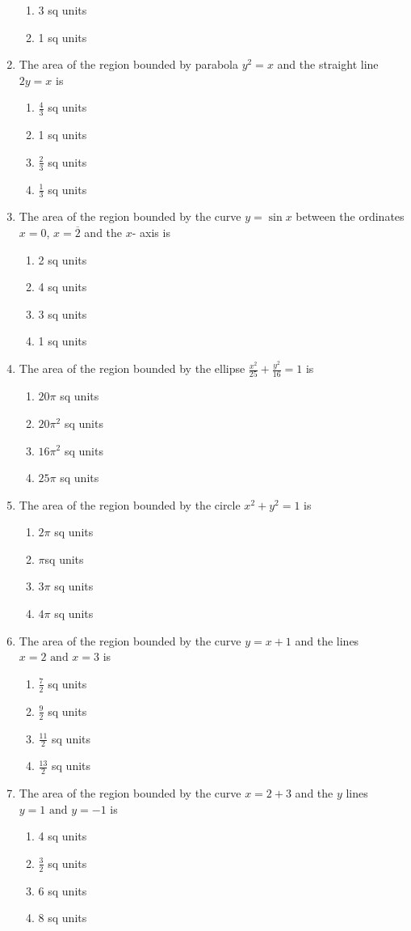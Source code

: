 \documentclass[12pt]{article}
\begin{document}
\begin{enumerate}[resume]
\begin{enumerate}
\item 3 sq units
\item 1 sq units
\end{enumerate}
\item The area of the region bounded by parabola $y^2 = x$ and the straight line $2y = x$ is
\begin{enumerate}
\item $\frac{4}{3}$ sq units
\item 1 sq units
\item $\frac{2}{3}$ sq units 
\item $\frac{1}{3}$ sq units
\end{enumerate}
\item The area of the region bounded by the curve $y = \sin x$ between the ordinates $x = 0$, $x = \overline{2}$ and the $x$- axis is
\begin{enumerate}
\item 2 sq units
\item 4 sq units
\item 3 sq units
\item 1 sq units
\end{enumerate}
\item The area of the region bounded by the ellipse $\frac{x^2}{25}+\frac{y^2}{16} = 1$ is
\begin{enumerate}
\item ${20\pi}$ sq units
\item ${20\pi^2}$ sq units 
\item ${16\pi^2}$ sq units
\item ${25\pi}$ sq units
\end{enumerate}
\item The area of the region bounded by the circle $x^2 + y^2 = 1$ is
\begin{enumerate}
\item ${2\pi}$ sq units
\item ${\pi}$sq units
\item ${3\pi}$ sq units
\item ${4\pi}$ sq units
\end{enumerate}
\item The area of the region bounded by the curve $y = x + 1$ and the lines $x = 2\text{ and }x = 3$ is
\begin{enumerate}
\item $\frac{7}{2}$ sq units
\item $\frac{9}{2}$ sq units
\item $\frac{11}{2}$ sq units
\item $\frac{13}{2}$ sq units
\end{enumerate}   
\item The area of the region bounded by the curve $x = 2 + 3$ and the $y$ lines $y = 1\text{ and }y = - 1$ is
\begin{enumerate}
\item 4 sq units 
\item $\frac{3}{2}$ sq units
\item 6 sq units
\item 8 sq units
\end{enumerate}
\end{enumerate}
\end{document}
